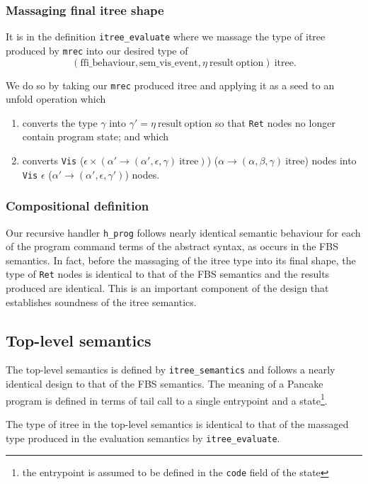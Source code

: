\documentclass[12pt,a4paper]{report}
\begin{document}
\subsubsection{Massaging final itree shape}
\label{sec:massaging-final-tree}

It is in the definition \texttt{itree\_evaluate} where we massage the type of itree produced by \texttt{mrec} into our desired type of
\begin{equation*}
  (\text{ffi\_behaviour}, \text{sem\_vis\_event}, \eta\ \text{result}\ \text{option})\ \text{itree}.
\end{equation*}

We do so by taking our \texttt{mrec} produced itree and applying it as a seed to an unfold operation which
\begin{enumerate}
  \item converts the type $\gamma$ into $\gamma' = \eta\ \text{result}\ \text{option}$ so that \texttt{Ret} nodes no longer contain program state; and which
  \item converts \texttt{Vis} ($\epsilon \times (\alpha' \to (\alpha', \epsilon, \gamma)\ \text{itree})$) ($\alpha \to (\alpha, \beta, \gamma)\ \text{itree}$) nodes into \texttt{Vis} $\epsilon$ ($\alpha' \to (\alpha', \epsilon, \gamma')$) nodes.
\end{enumerate}

\subsubsection{Compositional definition}
\label{sec:comp-defin}

Our recursive handler \texttt{h\_prog} follows nearly identical semantic behaviour for each of the program command terms of the abstract syntax, as occurs in the FBS semantics. In fact, before the massaging of the itree type into its final shape, the type of \texttt{Ret} nodes is identical to that of the FBS semantics and the results produced are identical. This is an important component of the design that establishes soundness of the itree semantics.

\subsection{Top-level semantics}
\label{sec:top-level-semantics}

The top-level semantics is defined by \texttt{itree\_semantics} and follows a nearly identical design to that of the FBS semantics. The meaning of a Pancake program is defined in terms of tail call to a single entrypoint and a state\footnote{the entrypoint is assumed to be defined in the \texttt{code} field of the state}.

The type of itree in the top-level semantics is identical to that of the massaged type produced in the evaluation semantics by \texttt{itree\_evaluate}.

\printbibliography
\end{document}
